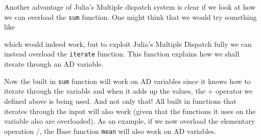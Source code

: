 Another advantage of Julia's Multiple dispatch system is clear if we look at how we can overload the \texttt{sum} function. One might think that we would try something like

which would indeed work, but to exploit Julia's Multiple Dispatch fully we can instead overload the \texttt{iterate} function. This function explains how we shall iterate through an AD variable. 

Now the built in \texttt{sum} function will work on AD variables since it knows how to iterate through the variable and when it adds up the values, the + operator we defined above is being used. And not only that! All built in functions that iterates through the input will also work (given that the functions it uses on the variable also are overloaded). As an example, if we now overload the elementary operation /, the Base function \texttt{mean} will also work on AD variables.

